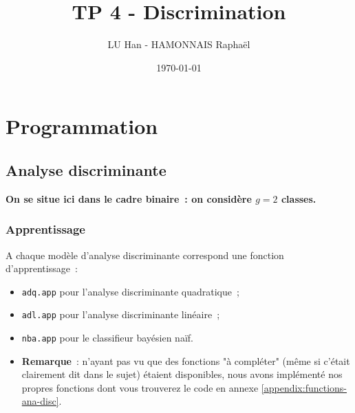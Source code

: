 \documentclass[a4paper,10pt]{report}
\title{TP 4 - Discrimination}
\author{LU Han - HAMONNAIS Raphaël}
\date{\today}
\begin{document}
\renewcommand{\labelitemi}{\large\textcolor{tatoebagreen}{\fg}}
\groovypdtitre
\restoregeometry %


\tableofcontents



\chapter{Programmation}



\section{Analyse discriminante}

\textbf{On se situe ici dans le cadre binaire~: on considère $g = 2$ classes.}

\subsection{Apprentissage}

A chaque modèle d'analyse discriminante correspond une fonction d'apprentissage~:
\begin{itemize}
	\item \texttt{adq.app} pour l'analyse discriminante quadratique~;
	\item \texttt{adl.app} pour l'analyse discriminante linéaire~;
	\item \texttt{nba.app} pour le classifieur bayésien naïf.
	\item \textbf{Remarque}~: n'ayant pas vu que des fonctions "à compléter" (même si c'était clairement dit dans le sujet) étaient disponibles, nous avons implémenté nos propres fonctions dont vous trouverez le code en annexe \ref{appendix:functions-ana-disc}.
\end{itemize}
\end{document}
